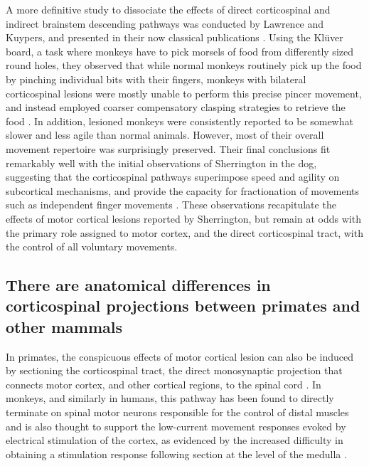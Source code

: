A more definitive study to dissociate the effects of direct corticospinal and indirect brainstem descending pathways was conducted by Lawrence and Kuypers, and presented in their now classical publications \citep{Lawrence1968,Lawrence1968a}. Using the Kl\"uver board, a task where monkeys have to pick morsels of food from differently sized round holes, they observed that while normal monkeys routinely pick up the food by pinching individual bits with their fingers, monkeys with bilateral corticospinal lesions were mostly unable to perform this precise pincer movement, and instead employed coarser compensatory clasping strategies to retrieve the food \citep{Lawrence1968}. In addition, lesioned monkeys were consistently reported to be somewhat slower and less agile than normal animals. However, most of their overall movement repertoire was surprisingly preserved. Their final conclusions fit remarkably well with the initial observations of Sherrington in the dog, suggesting that the corticospinal pathways superimpose speed and agility on subcortical mechanisms, and provide the capacity for fractionation of movements such as independent finger movements \citep{Lawrence1968}. These observations recapitulate the effects of motor cortical lesions reported by Sherrington, but remain at odds with the primary role assigned to motor cortex, and the direct corticospinal tract, with the control of all voluntary movements.

\subsection{There are anatomical differences in corticospinal projections between primates and other mammals}

In primates, the conspicuous effects of motor cortical lesion can also be induced by sectioning the corticospinal tract, the direct monosynaptic projection that connects motor cortex, and other cortical regions, to the spinal cord \citep{Tower1940,Lawrence1968}. In monkeys, and similarly in humans, this pathway has been found to directly terminate on spinal motor neurons responsible for the control of distal muscles \citep{Leyton1917,Bernhard1954} and is also thought to support the low-current movement responses evoked by electrical stimulation of the cortex, as evidenced by the increased difficulty in obtaining a stimulation response following section at the level of the medulla \citep{Woolsey1972}.

